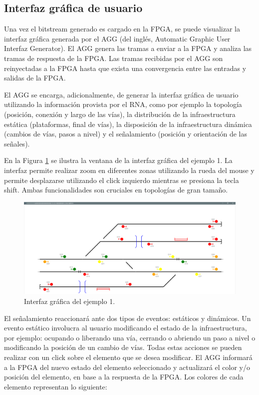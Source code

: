 \subsection{Interfaz gráfica de usuario}
	
	Una vez el bitstream generado es cargado en la FPGA, se puede visualizar la interfaz gráfica generada por el AGG (del inglés, Automatic Graphic User Interfaz Generator). El AGG genera las tramas a enviar a la FPGA y analiza las tramas de respuesta de la FPGA. Las tramas recibidas por el AGG son reinyectadas a la FPGA hasta que exista una convergencia entre las entradas y salidas de la FPGA.
	
	El AGG se encarga, adicionalmente, de generar la interfaz gráfica de usuario utilizando la información provista por el RNA, como por ejemplo la topología (posición, conexión y largo de las vías), la distribución de la infraestructura estática (plataformas, final de vías), la disposición de la infraestructura dinámica (cambios de vías, pasos a nivel) y el señalamiento (posición y orientación de las señales).
	
	En la Figura \ref{fig:EJ1_AGG} se ilustra la ventana de la interfaz gráfica del ejemplo 1. La interfaz permite realizar zoom en diferentes zonas utilizando la rueda del mouse y permite desplazarse utilizando el click izquierdo mientras se presiona la tecla shift. Ambas funcionalidades son cruciales en topologías de gran tamaño. 
	
	\begin{figure}[H]
		\centering
		\includegraphics[origin = c, width=1\textwidth]{resultados-obtenidos/ejemplo1/images/AGG_S32_YES}
		\centering\caption{Interfaz gráfica del ejemplo 1.}
		\label{fig:EJ1_AGG}
	\end{figure}
	
	El señalamiento reaccionará ante dos tipos de eventos: estáticos y dinámicos. Un evento estático involucra al usuario modificando el estado de la infraestructura, por ejemplo: ocupando o liberando una vía, cerrando o abriendo un paso a nivel o modificando la posición de un cambio de vías. Todas estas acciones se pueden realizar con un click sobre el elemento que se desea modificar. El AGG informará a la FPGA del nuevo estado del elemento seleccionado y actualizará el color y/o posición del elemento, en base a la respuesta de la FPGA. Los colores de cada elemento representan lo siguiente:
	
